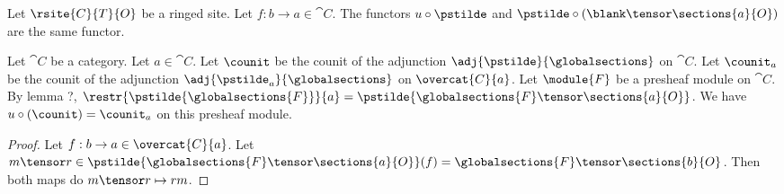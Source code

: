 \begin{lemma}
Let $\rsite{C}{T}{O}$ be a ringed site.
Let $f:b \rightarrow a \in \cat{C}$.
The functors $u \circ \pstilde$ 
and $\pstilde \circ (\blank \tensor \sections{a}{O})$ are the same functor.
\end{lemma}

\begin{lemma}
Let $\cat{C}$ be a category.
Let $a\in \cat{C}$.
Let $\counit$ be the counit of the adjunction $\adj{\pstilde}{\globalsections}$ on $\cat{C}$.
Let $\counit_a$ be the counit of the adjunction $\adj{\pstilde_a}{\globalsections}$ on $\overcat{C}{a}$.
Let $\module{F}$ be a presheaf module on $\cat{C}$.
By lemma ?, $\restr{\pstilde{\globalsections{F}}}{a} = \pstilde{\globalsections{F} \tensor \sections{a}{O}}$.
We have $u\circ(\counit) = \counit_a$ on this presheaf module. 
\end{lemma}

\begin{proof}
Let $f:b\rightarrow a \in \overcat{C}{a}$.
Let $m\tensor r \in \pstilde{\globalsections{F} \tensor \sections{a}{O}}(f) = \globalsections{F} \tensor \sections{b}{O}$.
Then both maps do $m\tensor r \mapsto rm$.
\end{proof}
